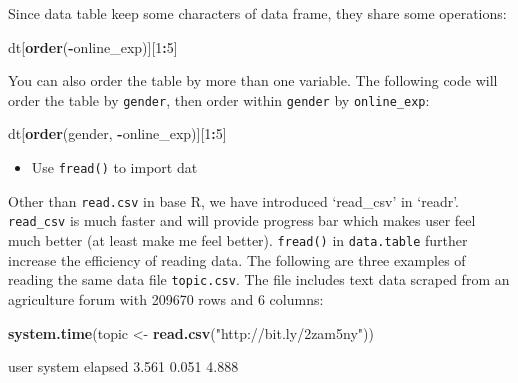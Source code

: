 \documentclass[12pt,]{krantz}
\makeatletter
\newenvironment{Shaded}{\begin{snugshade}}{\end{snugshade}}
\newcommand{\DecValTok}[1]{\textcolor[rgb]{0.06,0.06,0.06}{#1}}
\newcommand{\KeywordTok}[1]{\textcolor[rgb]{0.27,0.27,0.27}{\textbf{#1}}}
\newcommand{\NormalTok}[1]{#1}
\newcommand{\OperatorTok}[1]{\textcolor[rgb]{0.43,0.43,0.43}{\textbf{#1}}}
\newcommand{\StringTok}[1]{\textcolor[rgb]{0.5,0.5,0.5}{#1}}
\providecommand{\tightlist}{%
  \setlength{\itemsep}{0pt}\setlength{\parskip}{0pt}}
\newenvironment{kframe}{%
\medskip{}
\setlength{\fboxsep}{.8em}
 \def\at@end@of@kframe{}%
 \ifinner\ifhmode%
  \def\at@end@of@kframe{\end{minipage}}%
  \begin{minipage}{\columnwidth}%
 \fi\fi%
 \def\FrameCommand##1{\hskip\@totalleftmargin \hskip-\fboxsep
 \colorbox{shadecolor}{##1}\hskip-\fboxsep
     \hskip-\linewidth \hskip-\@totalleftmargin \hskip\columnwidth}%
 \MakeFramed {\advance\hsize-\width
   \@totalleftmargin\z@ \linewidth\hsize
   \@setminipage}}%
 {\par\unskip\endMakeFramed%
 \at@end@of@kframe}
\renewenvironment{Shaded}{\begin{kframe}}{\end{kframe}}
\makeatother
\begin{document}
Since data table keep some characters of data frame, they share some operations:

\begin{Shaded}
\begin{Highlighting}[]
\NormalTok{dt[}\KeywordTok{order}\NormalTok{(}\OperatorTok{-}\NormalTok{online_exp)][}\DecValTok{1}\OperatorTok{:}\DecValTok{5}\NormalTok{]}
\end{Highlighting}
\end{Shaded}

You can also order the table by more than one variable. The following code will order the table by \texttt{gender}, then order within \texttt{gender} by \texttt{online\_exp}:

\begin{Shaded}
\begin{Highlighting}[]
\NormalTok{dt[}\KeywordTok{order}\NormalTok{(gender, }\OperatorTok{-}\NormalTok{online_exp)][}\DecValTok{1}\OperatorTok{:}\DecValTok{5}\NormalTok{]}
\end{Highlighting}
\end{Shaded}

\begin{itemize}
\tightlist
\item
  Use \texttt{fread()} to import dat
\end{itemize}

Other than \texttt{read.csv} in base R, we have introduced `read\_csv' in `readr'. \texttt{read\_csv} is much faster and will provide progress bar which makes user feel much better (at least make me feel better). \texttt{fread()} in \texttt{data.table} further increase the efficiency of reading data. The following are three examples of reading the same data file \texttt{topic.csv}. The file includes text data scraped from an agriculture forum with 209670 rows and 6 columns:

\begin{Shaded}
\begin{Highlighting}[]
\KeywordTok{system.time}\NormalTok{(topic <-}\StringTok{ }\KeywordTok{read.csv}\NormalTok{(}\StringTok{"http://bit.ly/2zam5ny"}\NormalTok{))}
\end{Highlighting}
\end{Shaded}

\begin{Shaded}
\begin{Highlighting}[]
\NormalTok{   user  system elapsed }
\NormalTok{  3.561   0.051   4.888 }
\end{Highlighting}
\end{Shaded}
\end{document}
